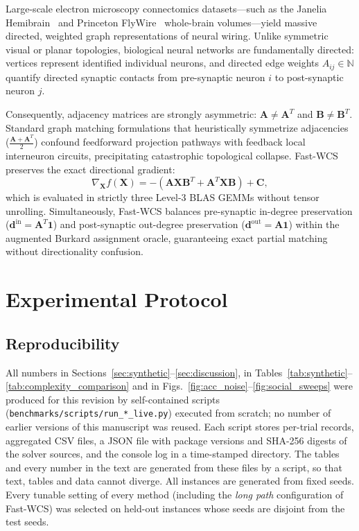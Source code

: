 \documentclass[conference]{IEEEtran}
\begin{document}
Large-scale electron microscopy connectomics datasets---such as the Janelia Hemibrain~\cite{scheffer2020} and Princeton FlyWire~\cite{dorkenwald2024} whole-brain volumes---yield massive directed, weighted graph representations of neural wiring. Unlike symmetric visual or planar topologies, biological neural networks are fundamentally directed: vertices represent identified individual neurons, and directed edge weights $A_{ij} \in \mathbb{N}$ quantify directed synaptic contacts from pre-synaptic neuron $i$ to post-synaptic neuron $j$. 

Consequently, adjacency matrices are strongly asymmetric: $\mathbf{A} \neq \mathbf{A}^T$ and $\mathbf{B} \neq \mathbf{B}^T$. Standard graph matching formulations that heuristically symmetrize adjacencies ($\frac{\mathbf{A} + \mathbf{A}^T}{2}$) confound feedforward projection pathways with feedback local interneuron circuits, precipitating catastrophic topological collapse. Fast-WCS preserves the exact directional gradient:
\begin{equation}
\nabla_{\mathbf{X}} f(\mathbf{X}) = -(\mathbf{A}\mathbf{X}\mathbf{B}^T + \mathbf{A}^T\mathbf{X}\mathbf{B}) + \mathbf{C},
\label{eq:asym_gradient}
\end{equation}
which is evaluated in strictly three Level-3 BLAS GEMMs without tensor unrolling. Simultaneously, Fast-WCS balances pre-synaptic in-degree preservation ($\mathbf{d}^{\text{in}} = \mathbf{A}^T\mathbf{1}$) and post-synaptic out-degree preservation ($\mathbf{d}^{\text{out}} = \mathbf{A}\mathbf{1}$) within the augmented Burkard assignment oracle, guaranteeing exact partial matching without directionality confusion.


\section{Experimental Protocol}
\label{sec:protocol}

\subsection{Reproducibility}
All numbers in Sections~\ref{sec:synthetic}--\ref{sec:discussion}, in Tables~\ref{tab:synthetic}--\ref{tab:complexity_comparison} and in Figs.~\ref{fig:acc_noise}--\ref{fig:social_sweeps} were produced for this revision by self-contained scripts (\texttt{benchmarks/scripts/run\_*\_live.py}) executed from scratch; no number of earlier versions of this manuscript was reused. Each script stores per-trial records, aggregated CSV files, a JSON file with package versions and SHA-256 digests of the solver sources, and the console log in a time-stamped directory. The tables and every number in the text are generated from these files by a script, so that text, tables and data cannot diverge. All instances are generated from fixed seeds. Every tunable setting of every method (including the \emph{long path} configuration of Fast-WCS) was selected on held-out instances whose seeds are disjoint from the test seeds.
\end{document}
